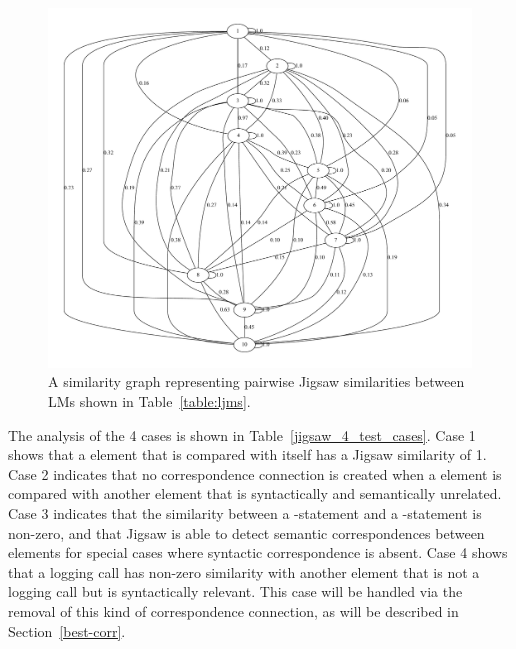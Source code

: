 \begin{figure}[t]
  \centering\includegraphics [width = \textwidth]{graphviz/jigsaw.pdf}
  \caption{A similarity graph representing pairwise Jigsaw similarities between LMs shown in Table~\ref{table:ljms}.}
  \label{fig:jigsaw_graph}
\end{figure}


The analysis of the 4 cases is shown in Table~\ref{jigsaw_4_test_cases}. Case 1 shows that a  element that is compared with itself has a Jigsaw similarity of 1. Case 2 indicates that no correspondence connection is created when a  element is compared with another  element that is syntactically and semantically unrelated. Case 3 indicates that the similarity between a -statement and a -statement is non-zero, and that Jigsaw is able to detect semantic correspondences between  elements for special cases where syntactic correspondence is absent. Case 4 shows that a logging call has non-zero similarity with another  element that is not a logging call but is syntactically relevant. This case will be handled via the removal of this kind of correspondence connection, as will be described in Section~\ref{best-corr}. %




